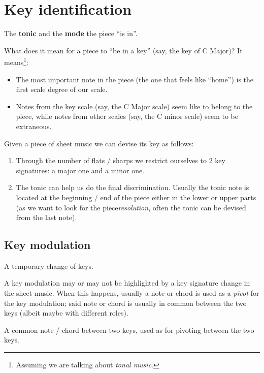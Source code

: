 \section{Key identification}
\begin{definition}
    The \textbf{tonic} and the \textbf{mode} the piece ``is in''.
\end{definition}

What does it mean for a piece to ``be in a key'' (say, the key of C Major)? It means\footnote{Assuming we are talking about \emph{tonal music}.}:
\begin{itemize}
    \item The most important note in the piece (the one that feels like ``home'') is the first scale degree of our scale.
    \item Notes from the key scale (say, the C Major scale) seem like to belong to the piece, while notes from other scales (say, the C minor scale) seem to be extraneous.
\end{itemize}

Given a piece of sheet music we can devise its key as follows:
\begin{enumerate}
    \item Through the number of flats / sharps we restrict ourselves to 2 key signatures: a major one and a minor one.
    \item The tonic can help us do the final discrimination. Usually the tonic note is located at the beginning / end of the piece either in the lower or upper parts (as we want to look for the piece\emph{resolution}, often the tonic can be devised from the last note).
\end{enumerate}

\subsection{Key modulation}
\begin{definition}
    A temporary change of keys.
\end{definition}

A key modulation may or may not be highlighted by a key signature change in the sheet music. When this happens, usually a note or chord is used as a \emph{pivot} for the key modulation; said note or chord is usually in common between the two keys (albeit maybe with different roles).

\begin{definition}[Pivot]
    A common note / chord between two keys, used as for pivoting between the two keys.
\end{definition}

